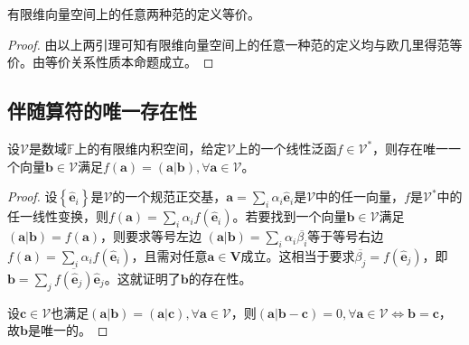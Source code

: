\documentclass[main.tex]{subfiles}
\begin{document}
\begin{theorem}\label{thm:VI.1.1}
有限维向量空间上的任意两种范的定义等价。
\end{theorem}
\begin{proof}
由以上两引理可知有限维向量空间上的任意一种范的定义均与欧几里得范等价。由等价关系性质本命题成立。
\end{proof}

\subsection{伴随算符的唯一存在性}
\begin{lemma}
设$\mathcal{V}$是数域$\mathbb{F}$上的有限维内积空间，给定$\mathcal{V}$上的一个线性泛函$f\in\mathcal{V}^*$，则存在唯一一个向量$\mathbf{b}\in\mathcal{V}$满足$f\left(\mathbf{a}\right)=\left(\mathbf{a}|\mathbf{b}\right),\forall\mathbf{a}\in\mathcal{V}$。
\end{lemma}
\begin{proof}
设$\left\{\mathbf{\hat{e}}_i\right\}$是$\mathcal{V}$的一个规范正交基，$\mathbf{a}=\sum_i\alpha_i\mathbf{\hat{e}}_i$是$\mathcal{V}$中的任一向量，$f$是$\mathcal{V}^*$中的任一线性变换，则$f\left(\mathbf{a}\right)=\sum_i\alpha_if\left(\mathbf{\hat{e}}_i\right)$。若要找到一个向量$\mathbf{b}\in\mathcal{V}$满足$\left(\mathbf{a}|\mathbf{b}\right)=f\left(\mathbf{a}\right)$，则要求等号左边
$\left(\mathbf{a}|\mathbf{b}\right)=\sum_i\alpha_i\overline{\beta_i}$等于等号右边$f\left(\mathbf{a}\right)=\sum_i\alpha_if\left(\mathbf{\hat{e}}_i\right)$，且需对任意$\mathbf{a}\in\mathbf{V}$成立。这相当于要求$\overline{\beta_j}=f\left(\mathbf{\hat{e}}_j\right)$，即$\mathbf{b}=\sum_j\overline{f\left(\mathbf{\hat{e}}_j\right)}\mathbf{\hat{e}}_j$。这就证明了$\mathbf{b}$的存在性。

设$\mathbf{c}\in\mathcal{V}$也满足$\left(\mathbf{a}|\mathbf{b}\right)=\left(\mathbf{a}|\mathbf{c}\right),\forall\mathbf{a}\in\mathcal{V}$，则$\left(\mathbf{a}|\mathbf{b}-\mathbf{c}\right)=0,\forall\mathbf{a}\in\mathcal{V}\Leftrightarrow\mathbf{b}=\mathbf{c}$，故$\mathbf{b}$是唯一的。
\end{proof}
\end{document}
